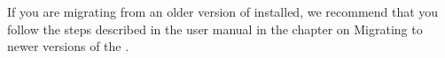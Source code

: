 If you are migrating from an older version of \app{} installed, we recommend that you follow the steps described in the user manual in the chapter on Migrating to newer versions of the \gddb{}.












 



